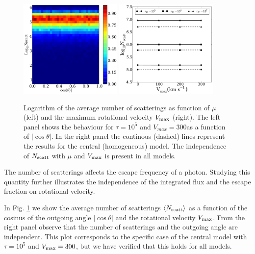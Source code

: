 \documentclass{emulateapj}
\newcommand{\ly}{{\ifmmode{{\rm Ly}\alpha~}\else{Ly$\alpha$~}\fi}}
\newcommand{\kms}{{\ifmmode{{\mathrm{\,km\ s}^{-1}}}\else{\,km~s$^{-1}$}\fi}}
\begin{document}
\begin{figure}
\begin{center}
    \includegraphics[width=0.45\textwidth]{f12.pdf}
    \includegraphics[width=0.45\textwidth]{f13.pdf}
\end{center}
\caption{Logarithm of the average number of scatterings as function of
  $\mu$ (left) and the maximum rotational velocity $V_{\rm
max}$ (right). The left panel shows the behaviour for $\tau=10^{5}$ and
  $V_{max}=300$\kms as a function of $\left|\cos\theta\right|$. In the
  right panel the continous (dashed) lines represent the results for
  the central (homogeneous) model. The independence of $N_{\rm scatt}$ with $\mu$ and $V_{\rm max}$ is
  present in all models.  
\label{fig:Nscatt} }
\end{figure}

The number of scatterings affects the escape frequency of a \ly
photon. Studying this quantity further illustrates the independence of
the integrated flux and the escape fraction on rotational velocity.

In Fig. \ref{fig:Nscatt} we show the average number of scatterings
$\langle N_{\rm scatt}\rangle$ as a function of the cosinus of the
outgoing angle $|\cos\theta|$ and the rotational velocity
$V_{\rm max}$. 
From the right panel observe that the number of scatterings and the
outgoing angle are independent. 
This plot corresponds to the specific case of the central model with
$\tau=10^5$ and $V_{\rm max}=300$\kms, but we have verified that this
holds for all models. 
\end{document}

